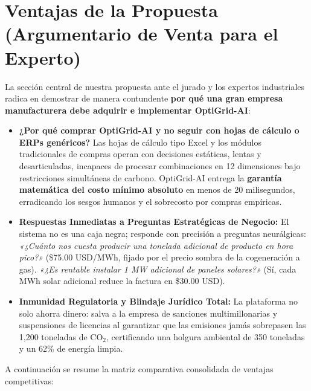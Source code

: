 \documentclass[11pt,a4paper]{article}
\begin{document}
\section{Ventajas de la Propuesta (Argumentario de Venta para el Experto)}
La sección central de nuestra propuesta ante el jurado y los expertos industriales radica en demostrar de manera contundente \textbf{por qué una gran empresa manufacturera debe adquirir e implementar OptiGrid-AI}:

\begin{itemize}
    \item \textbf{¿Por qué comprar OptiGrid-AI y no seguir con hojas de cálculo o ERPs genéricos?}
    Las hojas de cálculo tipo Excel y los módulos tradicionales de compras operan con decisiones estáticas, lentas y desarticuladas, incapaces de procesar combinaciones en 12 dimensiones bajo restricciones simultáneas de carbono. OptiGrid-AI entrega la \textbf{garantía matemática del costo mínimo absoluto} en menos de 20 milisegundos, erradicando los sesgos humanos y el sobrecosto por compras empíricas.
    \item \textbf{Respuestas Inmediatas a Preguntas Estratégicas de Negocio:}
    El sistema no es una caja negra; responde con precisión a preguntas neurálgicas: \textit{«¿Cuánto nos cuesta producir una tonelada adicional de producto en hora pico?»} (\$75.00 USD/MWh, fijado por el precio sombra de la cogeneración a gas). \textit{«¿Es rentable instalar 1 MW adicional de paneles solares?»} (Sí, cada MWh solar adicional reduce la factura en \$30.00 USD).
    \item \textbf{Inmunidad Regulatoria y Blindaje Jurídico Total:}
    La plataforma no solo ahorra dinero: salva a la empresa de sanciones multimillonarias y suspensiones de licencias al garantizar que las emisiones jamás sobrepasen las 1,200 toneladas de $\text{CO}_2$, certificando una holgura ambiental de 350 toneladas y un 62\% de energía limpia.
\end{itemize}

A continuación se resume la matriz comparativa consolidada de ventajas competitivas:
\end{document}
